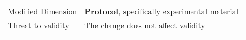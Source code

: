 \begin{table*}[h]
\begin{tabularx}{\textwidth}{
  >{\hsize=0.25\hsize}X
  >{\hsize=0.8\hsize}X}
    Modified Dimension & 
    \textbf{Protocol}, specifically experimental
    material \\   
    Threat to validity  & The change does not affect validity  \\  
 
   

	\noalign{\smallskip\smallskip}\hline
	\end{tabularx}  
\end{table*}
